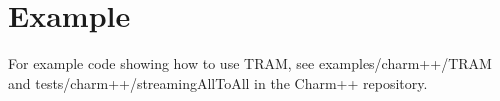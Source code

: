 
\section{Example}

For example code showing how to use TRAM, see examples/charm++/TRAM and
tests/charm++/streamingAllToAll in the Charm++ repository.

\thispagestyle{empty}
\pagestyle{empty}
